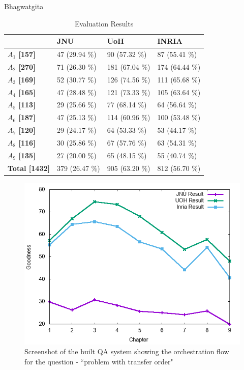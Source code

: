\documentclass[11pt]{article}
\begin{document}
Bhagwatgita
\begin{table}[h]
	\begin{center}
		\begin{tabular}{p{1.4cm} | p{1.6cm} | p{1.5cm} | p{1.5cm}}
			\hline 
			& \bf JNU & \bf UoH & \bf INRIA \\
			\hline
			
			
			\bf $A_1$ [157] &   47 (29.94 \%) &   90 (57.32 \%) &   87 (55.41 \%) \\
			\bf $A_2$ [270] &   71 (26.30 \%) &   181 (67.04 \%) &   174 (64.44 \%) \\
			\bf $A_3$ [169] &   52 (30.77 \%) &   126 (74.56 \%) &   111 (65.68 \%) \\
			\bf $A_4$ [165] &   47 (28.48 \%) &   121 (73.33 \%) &   105 (63.64 \%) \\
			\bf $A_5$ [113] &   29 (25.66 \%) &   77 (68.14 \%) &   64 (56.64 \%) \\
			\bf $A_6$ [187] &   47 (25.13 \%) &   114 (60.96 \%) &   100 (53.48 \%) \\
			\bf $A_7$ [120] &   29 (24.17 \%) &   64 (53.33 \%) &   53 (44.17 \%) \\
			\bf $A_8$ [116] &   30 (25.86 \%) &   67 (57.76 \%) &   63 (54.31 \%) \\
			\bf $A_9$ [135] &   27 (20.00 \%) &   65 (48.15 \%) &   55 (40.74 \%) \\
			\bf Total [1432] &   379 (26.47 \%) &   905 (63.20 \%) &   812 (56.70 \%) \\
			\hline
		\end{tabular}
	\end{center}
	\caption{\label{font-table} Evaluation Results }
\end{table}

\begin{figure}[h]
	\center
	\includegraphics[scale=0.34]{images/merge.png}
	\caption{\label{screen}Screenshot of the built QA system showing the orchestration flow for the question - ``problem with transfer order"}
\end{figure}
\end{document}

